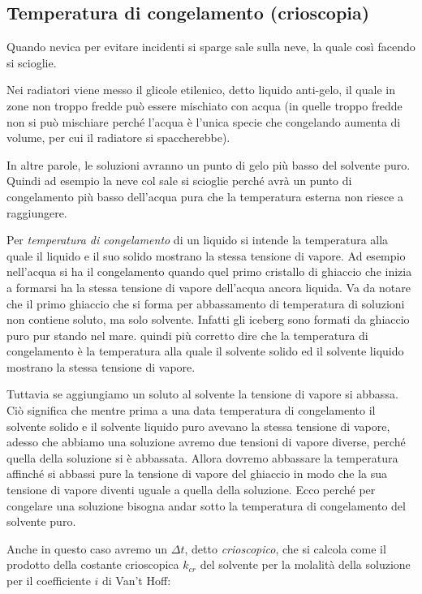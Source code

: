 \subsection{Temperatura di congelamento (crioscopia)}
Quando nevica per evitare incidenti si sparge sale sulla neve, la quale così facendo si scioglie.

Nei radiatori viene messo il glicole etilenico, detto liquido anti-gelo, il quale in zone non troppo fredde può essere mischiato con acqua (in quelle troppo fredde non si può mischiare perché l'acqua è l'unica specie che congelando aumenta di volume, per cui il radiatore si spaccherebbe).

In altre parole, le soluzioni avranno un punto di gelo più basso del solvente puro. Quindi ad esempio la neve col sale si scioglie perché avrà un punto di congelamento più basso dell'acqua pura che la temperatura esterna non riesce a raggiungere.

Per \textit{temperatura di congelamento} di un liquido si intende la temperatura alla quale il liquido e il suo solido mostrano la stessa tensione di vapore. Ad esempio nell'acqua si ha il congelamento quando quel primo cristallo di ghiaccio che inizia a formarsi ha la stessa tensione di vapore dell'acqua ancora liquida. Va da notare che il primo ghiaccio che si forma per abbassamento di temperatura di soluzioni non contiene soluto, ma solo solvente. Infatti gli iceberg sono formati da ghiaccio puro pur stando nel mare. \E quindi più corretto dire che la temperatura di congelamento è la temperatura alla quale il solvente solido ed il solvente liquido mostrano la stessa tensione di vapore.

Tuttavia se aggiungiamo un soluto al solvente la tensione di vapore si abbassa. Ciò significa che mentre prima a una data temperatura di congelamento il solvente solido e il solvente liquido puro avevano la stessa tensione di vapore, adesso che abbiamo una soluzione avremo due tensioni di vapore diverse, perché quella della soluzione si è abbassata. Allora dovremo abbassare la temperatura affinché si abbassi pure la tensione di vapore del ghiaccio in modo che la sua tensione di vapore diventi uguale a quella della soluzione. Ecco perché per congelare una soluzione bisogna andar sotto la temperatura di congelamento del solvente puro.

Anche in questo caso avremo un $\Delta t$, detto \textit{crioscopico}, che si calcola come il prodotto della costante crioscopica $k_{cr}$ del solvente per la molalità della soluzione per il coefficiente $i$ di Van't Hoff:

